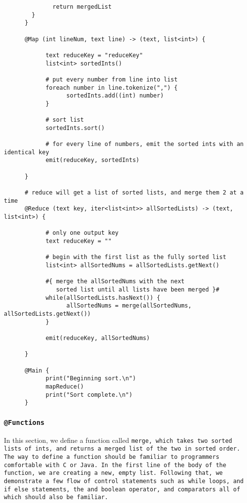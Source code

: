 \documentclass{article} \usepackage{fancyhdr, multicol}
\begin{document}
\begin{verbatim}
              return mergedList
        }
      }
      
      @Map (int lineNum, text line) -> (text, list<int>) {

            text reduceKey = "reduceKey"
            list<int> sortedInts()
            
            # put every number from line into list
            foreach number in line.tokenize(",") {
                  sortedInts.add((int) number)
            }
            
            # sort list
            sortedInts.sort()
            
            # for every line of numbers, emit the sorted ints with an identical key
            emit(reduceKey, sortedInts)
      
      }
      
      # reduce will get a list of sorted lists, and merge them 2 at a time
      @Reduce (text key, iter<list<int>> allSortedLists) -> (text, list<int>) {
            
            # only one output key
            text reduceKey = ""
            
            # begin with the first list as the fully sorted list 
            list<int> allSortedNums = allSortedLists.getNext()
            
            #{ merge the allSortedNums with the next 
               sorted list until all lists have been merged }#
            while(allSortedLists.hasNext()) {
                  allSortedNums = merge(allSortedNums, allSortedLists.getNext())
            }
            
            emit(reduceKey, allSortedNums)
            
      }
      
      @Main {
            print("Beginning sort.\n")
            mapReduce()
            print("Sort complete.\n")
      }

\end{verbatim}

\subsubsection*{\tt @Functions \rm}

In this section, we define a function called \tt merge\rm, which takes two sorted
\tt list\rm s of \tt int\rm s, and returns a merged \tt list \rm of the two in
sorted order. The way to define a function should be familiar to programmers
comfortable with C or Java. In the first line of the body of the function, we are
creating a new, empty list. Following that, we demonstrate a few flow of control
statements such as \tt while \rm loops, and \tt if else \rm statements, the \tt and
\rm boolean operator, and comparators all of which should also be familiar.
\end{document}
